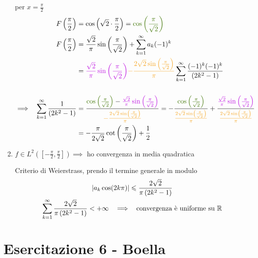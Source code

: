 \begin{enumerate}
per $x = \frac{\pi }{2}$\begin{equation*}
\begin{aligned}
F\left(\frac{\pi }{2}\right) & = \cos\left(\sqrt{2} \cdot \frac{\pi }{2}\right) = \textcolor[rgb]{0.25,0.46,0.02}{\cos\left(\frac{\pi }{\sqrt{2}}\right)}\\
F\left(\frac{\pi }{2}\right) & = \frac{\sqrt{2}}{\pi }\sin\left(\frac{\pi }{\sqrt{2}}\right) + \sum\limits ^{\infty }_{k = 1} a_{k}(- 1)^{k}\\
 & = \textcolor[rgb]{0.74,0.06,0.88}{\frac{\sqrt{2}}{\pi }\sin\left(\frac{\pi }{\sqrt{2}}\right)}\textcolor[rgb]{0.96,0.65,0.14}{ - \frac{2\sqrt{2}\sin\left(\frac{\pi }{\sqrt{2}}\right)}{\pi }}\sum\limits ^{\infty }_{k = 1}\frac{(- 1)^{k}(- 1)^{k}}{\left(2k^{2} - 1\right)}\\
 & \\
\implies \ \ \sum\limits ^{\infty }_{k = 1}\frac{1}{\left(2k^{2} - 1\right)} & = \frac{\textcolor[rgb]{0.25,0.46,0.02}{\cos\left(\frac{\pi }{\sqrt{2}}\right)} - \textcolor[rgb]{0.74,0.06,0.88}{\frac{\sqrt{2}}{\pi }\sin\left(\frac{\pi }{\sqrt{2}}\right)}}{\textcolor[rgb]{0.96,0.65,0.14}{ - \frac{2\sqrt{2}\sin\left(\frac{\pi }{\sqrt{2}}\right)}{\pi }}} = - \frac{\textcolor[rgb]{0.25,0.46,0.02}{\cos\left(\frac{\pi }{\sqrt{2}}\right)}}{\textcolor[rgb]{0.96,0.65,0.14}{\frac{2\sqrt{2}\sin\left(\frac{\pi }{\sqrt{2}}\right)}{\pi }}} + \frac{\textcolor[rgb]{0.74,0.06,0.88}{\frac{\sqrt{2}}{\pi }\sin\left(\frac{\pi }{\sqrt{2}}\right)}}{\textcolor[rgb]{0.96,0.65,0.14}{\frac{2\sqrt{2}\sin\left(\frac{\pi }{\sqrt{2}}\right)}{\pi }}}\\
 & = - \frac{\pi }{2\sqrt{2}}\cot\left(\frac{\pi }{\sqrt{2}}\right) + \frac{1}{2}
\end{aligned}
\end{equation*}
\item $f\in L^{2}\left(\left[ - \frac{\pi }{2} ,\frac{\pi }{2}\right]\right) \implies $ ho convergenza in media quadratica

Criterio di Weierstrass, prendo il termine generale in modulo\begin{gather*}
| a_{k}\cos(2k\pi)| \leqslant \frac{2\sqrt{2}}{\pi \left(2k^{2} - 1\right)}\\
\sum\limits ^{\infty }_{k = 1}\frac{2\sqrt{2}}{\pi \left(2k^{2} - 1\right)} < + \infty \ \ \implies \ \ \text{convergenza è uniforme su} \ \mathbb{R} 
\end{gather*}
\end{enumerate}
\chapter{Esercitazione 6 - Boella}
\ParteEsercizi
\Esercizio{}

